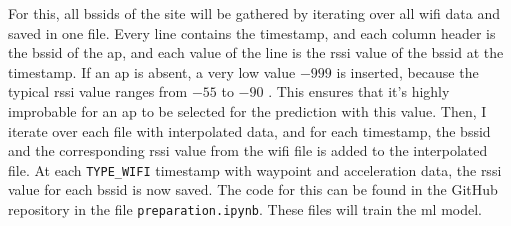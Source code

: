 For this, all \acp{bssid} of the site will be gathered by iterating over all \ac{wifi} data and saved in one file.
Every line contains the timestamp, and each column header is the \ac{bssid} of the \ac{ap}, and each value of the line is the \ac{rssi} value of the \ac{bssid} at the timestamp.
If an \ac{ap} is absent, a very low value \(-999\) is inserted, because the typical \ac{rssi} value ranges from \(-55\) to \(-90\) \cite{rssi_calculation}.
This ensures that it's highly improbable for an \ac{ap} to be selected for the prediction with this value.
Then, I iterate over each file with interpolated data, and for each timestamp, the \ac{bssid} and the corresponding \ac{rssi} value from the \ac{wifi} file is added to the interpolated file.
At each \texttt{TYPE\_WIFI} timestamp with waypoint and acceleration data, the \ac{rssi} value for each \ac{bssid} is now saved.
The code for this can be found in the GitHub repository in the file \texttt{preparation.ipynb}.
These files will train the \ac{ml} model.

